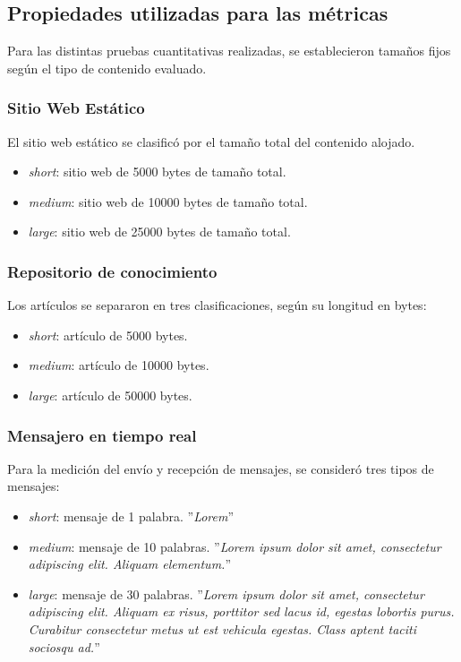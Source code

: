 \subsection{Propiedades utilizadas para las métricas}

Para las distintas pruebas cuantitativas realizadas, se establecieron tamaños fijos según el tipo de contenido evaluado.

\subsubsection{Sitio Web Estático}

El sitio web estático se clasificó por el tamaño total del contenido alojado.

\begin{itemize}
    \item \textit{short}: sitio web de 5000 bytes de tamaño total.
    \item \textit{medium}: sitio web de 10000 bytes de tamaño total.
    \item \textit{large}: sitio web de 25000 bytes de tamaño total.
\end{itemize}

\subsubsection{Repositorio de conocimiento}

Los artículos se separaron en tres clasificaciones, según su longitud en bytes:

\begin{itemize}
    \item \textit{short}: artículo de 5000 bytes.
    \item \textit{medium}: artículo de 10000 bytes.
    \item \textit{large}: artículo de 50000 bytes.
\end{itemize}

\subsubsection{Mensajero en tiempo real}

Para la medición del envío y recepción de mensajes, se consideró tres tipos de mensajes:

\begin{itemize}
    \item \textit{short}: mensaje de 1 palabra. ''\textit{Lorem}''
    \item \textit{medium}: mensaje de 10 palabras. ''\textit{Lorem ipsum dolor sit amet, consectetur adipiscing elit. Aliquam elementum.}''
    \item \textit{large}: mensaje de 30 palabras. ''\textit{Lorem ipsum dolor sit amet, consectetur adipiscing elit. Aliquam ex risus, porttitor sed lacus id, egestas lobortis purus. Curabitur consectetur metus ut est vehicula egestas. Class aptent taciti sociosqu ad.}''
\end{itemize}

